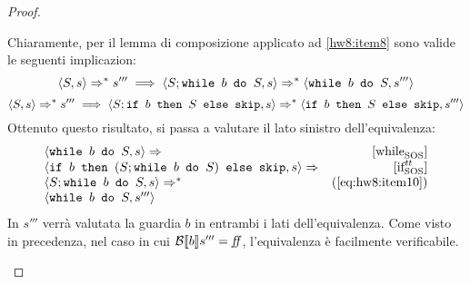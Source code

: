 \begin{proof}
\begin{itemize}
  Chiaramente, per il lemma di composizione applicato ad \ref{hw8:item8} sono
  valide le seguenti implicazion:
  \begin{equation}
  \confSs{S}{s} \Rar{*} s'''
    \implies
  \confSs{S; \wbS{b}{S}}{s} \Rar{*} \confSs{\wbS{b}{S}}{s'''}
  \label{eq:hw8:item10}
  \end{equation}
  \begin{equation}
  \confSs{S}{s} \Rar{*} s'''
    \implies
  \confSs{S; \ifABC{b}{S}{\skipForFriends}}{s} \Rar{*}
        \confSs{\ifABC{b}{S}{\skipForFriends}}{s'''}
  \label{eq:hw8:itemX}
  \end{equation}
  Ottenuto questo risultato, si passa a valutare il lato sinistro
  dell'equivalenza:
  $$
  \begin{array}{lr}
  \confSs{\wbS{b}{S}}{s} \Rar{ }  & \whileSOS \\
  \confSs{\ifABC{b}{(S;\wbS{b}{S})}{\skipForFriends}}{s} \Rar{ } & \ifttSOS\\
  \confSs{S; \wbS{b}{S}}{s} \Rar{*} & (\text{\ref{eq:hw8:item10}})\\
  \confSs{\wbS{b}{S}}{s'''}
  \end{array}
  $$
  In $s'''$ verrà valutata la guardia $b$ in entrambi i lati dell'equivalenza.
  Come visto in precedenza, nel caso in cui $\B{b}''' = \semfalse$,
  l'equivalenza è facilmente verificabile.


\end{itemize}
\end{proof}
